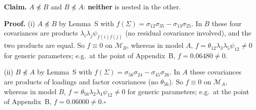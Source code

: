 \documentclass[10pt,a4paper]{article}
\newcommand{\nnest}{\not\preceq}
\begin{document}
\par\bigskip
\noindent\textbf{Claim.} $A \nnest B$ and $B \nnest A$: \textbf{neither} is nested in the other.\par\smallskip
\noindent\textbf{Proof.} (i) $A\nnest B$ by Lemma~S with $f(\Sigma)=\sigma_{12}\sigma_{35} - \sigma_{13}\sigma_{25}$. In $B$ these four covariances are products $\lambda_i\lambda_j\psi_{f(i)f(j)}$ (no residual covariance involved), and the two products are equal. So $f\equiv0$ on $\mathcal M_B$, whereas in model $A$, $f=\theta_{12}\lambda_3\lambda_5\psi_{12}\neq0$ for generic parameters; e.g.\ at the point of Appendix~B, $f=0.06480\neq0$.\par\smallskip
\noindent(ii) $B\nnest A$ by Lemma~S with $f(\Sigma)=\sigma_{56}\sigma_{24} - \sigma_{45}\sigma_{26}$. In $A$ these covariances are products of loadings and factor covariances (no $\theta_{56}$). So $f\equiv0$ on $\mathcal M_A$, whereas in model $B$, $f=\theta_{56}\lambda_2\lambda_4\psi_{12}\neq0$ for generic parameters; e.g.\ at the point of Appendix~B, $f=0.06000\neq0$.\hfill$\square$\par\medskip
{}

\clearpage
\end{document}
